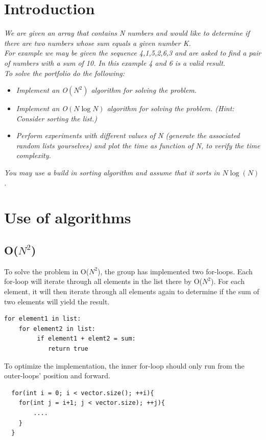 \section{Introduction}
\emph{We are given an array that contains N numbers and would like to determine if there are two numbers whose sum equals a given number K.\\
For example we may be given the sequence 4,1,5,2,6,3 and are asked to find a pair of numbers with a sum of 10. In this example 4 and 6 is a valid result.\\
To solve the portfolio do the following:}
\begin{itemize}
\item \emph{Implement an O\(\left( { N }^{ 2 } \right)\) algorithm for solving the problem.}
\item \emph{Implement an O\(\left( N\log {N }  \right) \) algorithm for solving the problem. (Hint: Consider sorting the list.)}
\item \emph{Perform experiments with different values of \textit{N} (generate the associated random lists yourselves)
and plot the time as function of \textit{N}, to verify the time complexity.}
\end{itemize}
\emph{You may use a build in sorting algorithm and assume that it sorts in \( N\log {(N) }  \).}

\section{Use of algorithms}
\subsection{O(\(N^{2}\))}
To solve the problem in O(\(N^{2}\)), the group has implemented two for-loops. Each for-loop will iterate through all elements in the list there by O(\(N^{2}\)). For each element, it will then iterate through all elements again to determine if the sum of two elements will yield the result.
\begin{lstlisting}
for element1 in list:
    for element2 in list:
         if element1 + elemt2 = sum:
            return true
\end{lstlisting}
To optimize the implementation, the inner for-loop should only run from the outer-loops' position and forward.
\begin{lstlisting}
  for(int i = 0; i < vector.size(); ++i){
  	for(int j = i+1; j < vector.size); ++j){
  		....
  	}
  }
\end{lstlisting}

